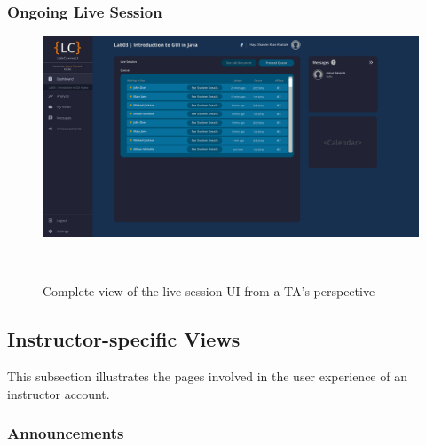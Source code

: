 \documentclass[a4paper, 12pt]{article}
\begin{document}
    
    
    \pagebreak
    
    \subsubsection{Ongoing Live Session}
     
    \begin{figure}[H]
        \centering
        \includegraphics[width=\textwidth]{ta_live_session}
        \caption{Complete view of the live session UI from a TA's perspective}~\label{fig:ta_live_session_full}
    \end{figure}
    

    
    
    
    
    
    
    
    
    
    \pagebreak
    
    
    \subsection{Instructor-specific Views}
    
    This subsection illustrates the pages involved in the user experience of an instructor account.
    
    \subsubsection{Announcements}
     
\end{document}
